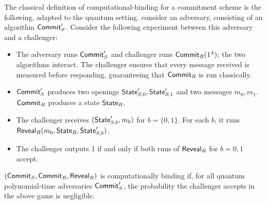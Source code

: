 The classical definition of computational-binding for a commitment scheme is the following, adapted to the quantum setting.  consider an adversary, consisting of an algorithm ${\sf Commit}_S'$.  Consider the following experiment between this adversary and a challenger:

\begin{itemize}
	\item The adversary runs ${\sf Commit}_S'$ and challenger runs ${\sf Commit}_R(1^\lambda)$; the two algorithms interact.  The challenger ensures that every message received is measured before responding, guaranteeing that ${\sf Commit}_R$ is run classically. 
	\item ${\sf Commit}_S'$ produces two openings ${\sf State}_{S,0}',{\sf State}_{S,1}'$ and two messages $m_0,m_1$.  ${\sf Commit}_R$ produces a state ${\sf State}_R$.
	\item The challenger receives $({\sf State}_{S,b}',m_b)$ for $b=\{0,1\}$.  For each $b$, it runs ${\sf Reveal}_R(m_0,{\sf State}_R,{\sf State}_{S,b}')$.
	\item The challenger outputs 1 if and only if both runs of ${\sf Reveal}_R$ for $b=0,1$ accept.
\end{itemize}


\begin{definition} $({\sf Commit}_S,{\sf Commit}_R,{\sf Reveal}_R)$ is computationally binding if, for all quantum polynomial-time adversaries ${\sf Commit}_S'$, the probability the challenger accepts in the above game is negligible.
\end{definition}

